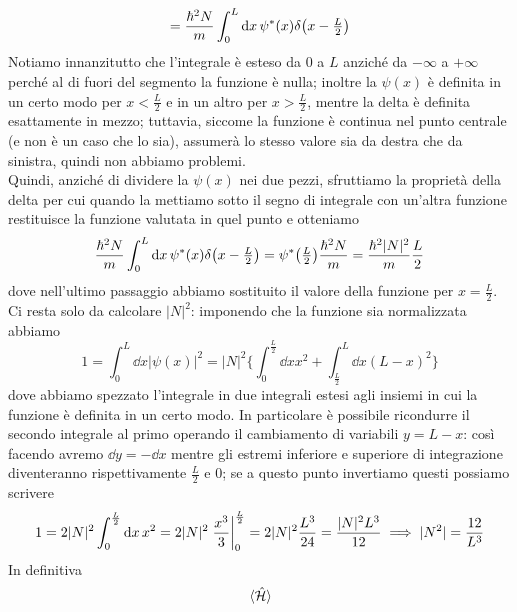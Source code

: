 \begin{soluzione}
\begin{equation*}
      =\frac{\hbar^2 N}{m} \int_{0}^{L} \dd{x} \psi^*(x) \delta\qty( x - \textstyle \frac{L}{2} )
   \end{equation*}
   Notiamo innanzitutto che l'integrale è esteso da $0$ a $L$ anziché da $-\infty$ a $+\infty$ perché al di fuori del segmento la funzione è nulla; inoltre la $\psi(x)$ è definita in un certo modo per $x<\frac{L}{2}$ e in un altro per $x>\frac{L}{2}$, mentre la delta è definita esattamente in mezzo; tuttavia, siccome la funzione è continua nel punto centrale (e non è un caso che lo sia), assumerà lo stesso valore sia da destra che da sinistra, quindi non abbiamo problemi.\\
   Quindi, anziché di dividere la $\psi(x)$ nei due pezzi, sfruttiamo la proprietà della delta per cui quando la mettiamo sotto il segno di integrale con un'altra funzione restituisce la funzione valutata in quel punto e otteniamo
   \begin{equation*}
      \frac{\hbar^2N}{m} \int_{0}^{L} \dd{x} \psi^*(x) \delta\qty( x - \textstyle \frac{L}{2} )
      =\psi^*\qty( \textstyle \frac{L}{2} ) \displaystyle \frac{\hbar^2N}{m}
      =\frac{\hbar^2|N|^2}{m} \frac{L}{2}
   \end{equation*}
   dove nell'ultimo passaggio abbiamo sostituito il valore della funzione per $x=\frac{L}{2}$.\\
   Ci resta solo da calcolare $|N|^2$: imponendo che la funzione sia normalizzata abbiamo
   \begin{equation*}
      1=\int_{0}^{L} \dd{x} |\psi(x)|^2
      =|N|^2 \biggl\{ \int_{0}^{\frac{L}{2}} \dd{x} x^2 + \int_{\frac{L}{2}}^{L} \dd{x} (L - x)^2 \biggr\}
   \end{equation*}
   dove abbiamo spezzato l'integrale in due integrali estesi agli insiemi in cui la funzione è definita in un certo modo. In particolare è possibile ricondurre il secondo integrale al primo operando il cambiamento di variabili $y=L-x$: così facendo avremo $\dd{y}=-\dd{x}$ mentre gli estremi inferiore e superiore di integrazione diventeranno rispettivamente $\frac{L}{2}$ e $0$; se a questo punto invertiamo questi possiamo scrivere
   \begin{equation*}
      1=2|N|^2 \int_{0}^{\frac{L}{2}} \dd{x} x^2
      =2|N|^2 \eval*{\frac{x^3}{3}}_{0}^{\frac{L}{2}}
      =2|N|^2 \frac{L^3}{24}
      =\frac{|N|^2L^3}{12}
      \implies
      |N^2|=\frac{12}{L^3}
   \end{equation*}
   In definitiva
   \begin{equation*}
      \expval*{\hat{\mathcal{H}}}

\end{equation*}
\end{soluzione}
